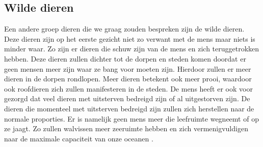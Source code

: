 \subsection{Wilde dieren}
Een andere groep dieren die we graag zouden bespreken zijn de wilde dieren. Deze dieren zijn op het eerste gezicht niet zo verwant met de mens maar niets is minder waar.
\newline
Zo zijn er dieren die schuw zijn van de mens en zich teruggetrokken hebben. Deze dieren zullen dichter tot de dorpen en steden komen doordat er geen mensen meer zijn waar ze bang voor moeten zijn. Hierdoor zullen er meer dieren in de dorpen rondlopen. Meer dieren betekent ook meer prooi, waardoor ook roofdieren zich zullen manifesteren in de steden.
\newline
De mens heeft er ook voor gezorgd dat veel dieren met uitsterven bedreigd zijn of al uitgestorven zijn. De dieren die momenteel met uitsterven bedreigd zijn zullen zich herstellen naar de normale proporties. Er is namelijk geen mens meer die leefruimte wegneemt of op ze jaagt. Zo zullen walvissen meer zeeruimte hebben en zich vermenigvuldigen naar de maximale capaciteit van onze oceanen \cite{LAPOutbreak}.

\newpage
